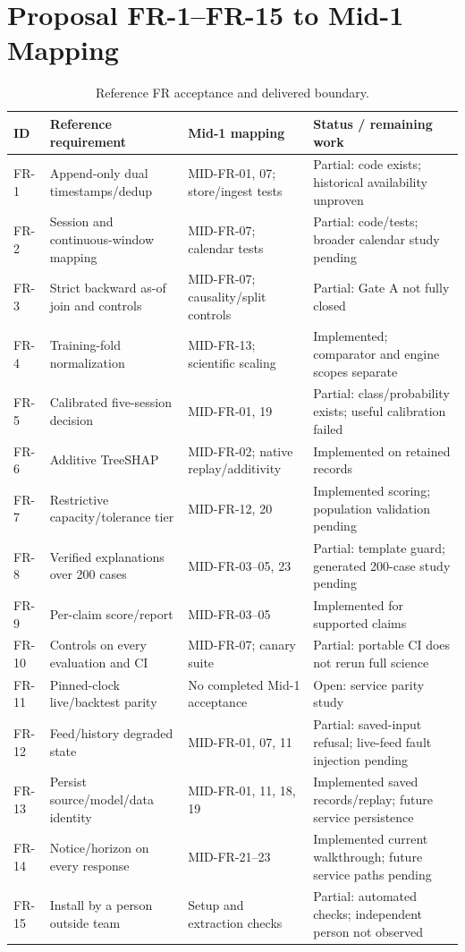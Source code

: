 \section{Proposal FR-1--FR-15 to Mid-1 Mapping}
\begingroup\small
\begin{longtable}{p{}p{}p{}p{}}
\caption{Reference FR acceptance and delivered boundary.}\label{tab:proposal-fr-mapping}\\\toprule ID & Reference requirement & Mid-1 mapping & Status / remaining work\\\midrule
FR-1 & Append-only dual timestamps/dedup & MID-FR-01, 07; store/ingest tests & Partial: code exists; historical availability unproven\\
FR-2 & Session and continuous-window mapping & MID-FR-07; calendar tests & Partial: code/tests; broader calendar study pending\\
FR-3 & Strict backward as-of join and controls & MID-FR-07; causality/split controls & Partial: Gate A not fully closed\\
FR-4 & Training-fold normalization & MID-FR-13; scientific scaling & Implemented; comparator and engine scopes separate\\
FR-5 & Calibrated five-session decision & MID-FR-01, 19 & Partial: class/probability exists; useful calibration failed\\
FR-6 & Additive TreeSHAP & MID-FR-02; native replay/additivity & Implemented on retained records\\
FR-7 & Restrictive capacity/tolerance tier & MID-FR-12, 20 & Implemented scoring; population validation pending\\
FR-8 & Verified explanations over 200 cases & MID-FR-03--05, 23 & Partial: template guard; generated 200-case study pending\\
FR-9 & Per-claim score/report & MID-FR-03--05 & Implemented for supported claims\\
FR-10 & Controls on every evaluation and CI & MID-FR-07; canary suite & Partial: portable CI does not rerun full science\\
FR-11 & Pinned-clock live/backtest parity & No completed Mid-1 acceptance & Open: service parity study\\
FR-12 & Feed/history degraded state & MID-FR-01, 07, 11 & Partial: saved-input refusal; live-feed fault injection pending\\
FR-13 & Persist source/model/data identity & MID-FR-01, 11, 18, 19 & Implemented saved records/replay; future service persistence\\
FR-14 & Notice/horizon on every response & MID-FR-21--23 & Implemented current walkthrough; future service paths pending\\
FR-15 & Install by a person outside team & Setup and extraction checks & Partial: automated checks; independent person not observed\\
\bottomrule\end{longtable}\endgroup
